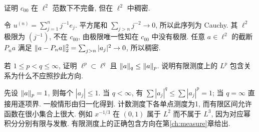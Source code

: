 \begin{exercise}\label{legacy:ch01:exercise1}
证明 $c_{00}$ 在 $\ell^2$ 范数下不完备, 但在 $\ell^2$ 中稠密.
\end{exercise}
\begin{solution}
令 $u^{(n)}=\sum_{j=1}^n j^{-1}e_j$. 平方尾和 $\sum_{j>n}j^{-2}\to0$, 所以此序列为 Cauchy. 其 $\ell^2$ 极限为 $(j^{-1})$, 不在 $c_{00}$, 由极限唯一性知在 $c_{00}$ 中没有极限. 任意 $a\in\ell^2$ 的截断 $P_na$ 满足 $\lVert a-P_na\rVert_2^2=\sum_{j>n}|a_j|^2\to0$, 所以稠密.
\end{solution}

\begin{exercise}\label{legacy:ch01:exercise2}
若 $1\le p<q\le\infty$, 证明 $\ell^p\subset\ell^q$ 且 $\lVert a\rVert_q\le\lVert a\rVert_p$. 说明有限测度上的 $L^p$ 包含关系为什么不应照抄此方向.
\end{exercise}
\begin{solution}
先设 $\lVert a\rVert_p=1$, 则每个 $|a_j|\le1$. 当 $q<\infty$, 有 $\sum|a_j|^q\le\sum|a_j|^p=1$; 当 $q=\infty$ 直接用逐项界. 一般情形由归一化得到. 计数测度下各单点测度为1, 而有限区间允许函数在很小集合上很大. 例如 $x^{-1/3}$ 在 $(0,1)$ 属于 $L^2$ 而不属于 $L^3$, 因为对应幂积分分别有限与发散. 有限测度上的正确包含方向在第\ref{ch:measure}章给出.
\end{solution}
